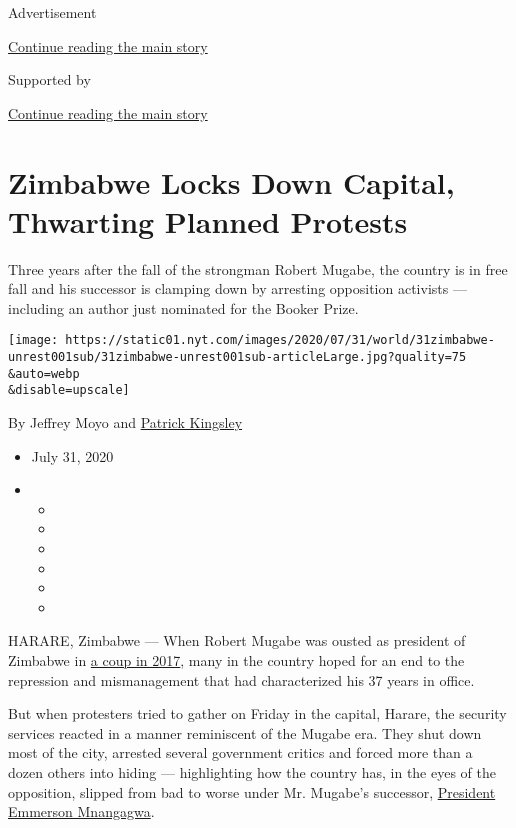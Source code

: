 Advertisement

\protect\hyperlink{after-top}{Continue reading the main story}

Supported by

\protect\hyperlink{after-sponsor}{Continue reading the main story}

\hypertarget{zimbabwe-locks-down-capital-thwarting-planned-protests}{%
\section{Zimbabwe Locks Down Capital, Thwarting Planned
Protests}\label{zimbabwe-locks-down-capital-thwarting-planned-protests}}

Three years after the fall of the strongman Robert Mugabe, the country
is in free fall and his successor is clamping down by arresting
opposition activists --- including an author just nominated for the
Booker Prize.

\texttt{[image: https://static01.nyt.com/images/2020/07/31/world/31zimbabwe-unrest001sub/31zimbabwe-unrest001sub-articleLarge.jpg?quality=75\\\&auto=webp\\\&disable=upscale]}

By Jeffrey Moyo and
\href{https://www.nytimes.com/by/patrick-kingsley}{Patrick Kingsley}

\begin{itemize}
\item
  July 31, 2020
\item
  \begin{itemize}
  \item
  \item
  \item
  \item
  \item
  \item
  \end{itemize}
\end{itemize}

HARARE, Zimbabwe --- When Robert Mugabe was ousted as president of
Zimbabwe in
\href{https://www.nytimes.com/2017/11/21/world/africa/zimbabwe-mugabe-mnangagwa.html}{a
coup in 2017}, many in the country hoped for an end to the repression
and mismanagement that had characterized his 37 years in office.

But when protesters tried to gather on Friday in the capital, Harare,
the security services reacted in a manner reminiscent of the Mugabe era.
They shut down most of the city, arrested several government critics and
forced more than a dozen others into hiding --- highlighting how the
country has, in the eyes of the opposition, slipped from bad to worse
under Mr. Mugabe's successor,
\href{https://www.nytimes.com/2019/08/10/world/africa/zimbabwe-president-emmerson-mnangagwa-mugabe.html}{President
Emmerson Mnangagwa}.


